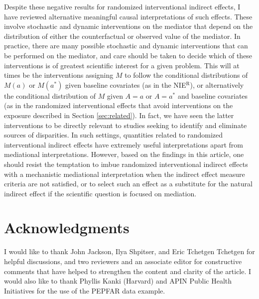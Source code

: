 \documentclass[12pt]{article}
\begin{document}
Despite these negative results for randomized interventional indirect effects, I have reviewed alternative meaningful causal interpretations of such effects. These involve stochastic and dynamic interventions on the mediator that depend on the distribution of either the counterfactual or observed value of the mediator. In practice, there are many possible stochastic and dynamic interventions that can be performed on the mediator, and care should be taken to decide which of these interventions is of greatest scientific interest for a given problem. This will at times be the interventions assigning $M$ to follow the conditional distributions of $M(a)$ or $M(a^*)$ given baseline covariates (as in the NIE$^{\mathrm{R}}$), or alternatively the conditional distribution of $M$ given $A=a$ or $A=a^*$ and baseline covariates (as in the randomized interventional effects that avoid interventions on the exposure described in Section \ref{sec:related}). In fact, we have seen the latter interventions to be directly relevant to studies seeking to identify and eliminate sources of disparities. In such settings, quantities related to randomized interventional indirect effects have extremely useful interpretations apart from mediational interpretations. However, based on the findings in this article, one should resist the temptation to imbue randomized interventional indirect effects with a mechanistic mediational interpretation when the indirect effect measure criteria are %
not satisfied, %
or to select such an effect as a substitute for the natural indirect effect if the scientific question is focused on mediation.


\section*{\centering Acknowledgments}
I would like to thank John Jackson, Ilya Shpitser, and Eric Tchetgen Tchetgen for helpful discussions, and two reviewers and an associate editor for constructive comments that have helped to strengthen the content and clarity of the article. I would also like to thank Phyllis Kanki (Harvard) and APIN Public Health Initiatives for the use of the PEPFAR data example.
\end{document}
